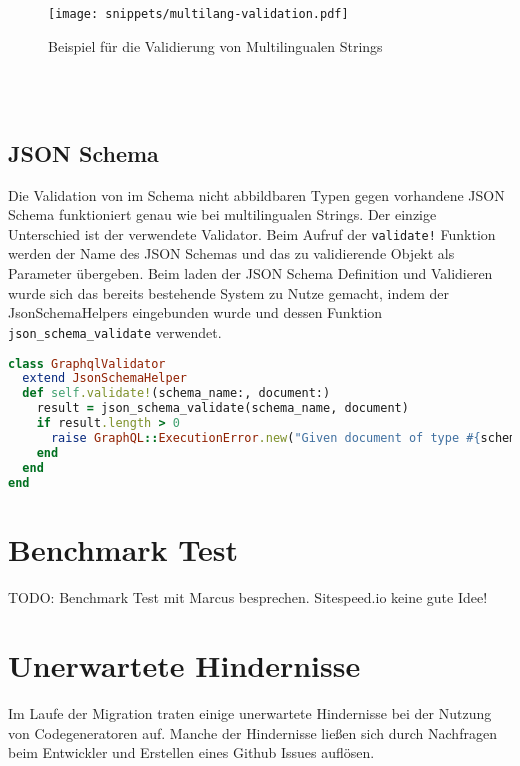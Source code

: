 \begin{figure}[h!]
    \centering
    \texttt{[image: snippets/multilang-validation.pdf]}
    \caption{Beispiel für die Validierung von Multilingualen Strings}
    \label{req:typesafe:example}
\end{figure}

\ \\
\ \\

\subsection{JSON Schema}
Die Validation von im Schema nicht abbildbaren Typen gegen vorhandene JSON Schema funktioniert genau wie bei multilingualen Strings. Der einzige Unterschied ist der verwendete Validator. Beim Aufruf der \lstinline|validate!| Funktion werden der Name des JSON Schemas und das zu validierende Objekt  als Parameter übergeben. Beim laden der JSON Schema Definition und Validieren wurde sich das bereits bestehende System zu Nutze gemacht, indem der JsonSchemaHelpers eingebunden wurde und dessen Funktion \lstinline|json_schema_validate| verwendet. 

\begin{lstlisting}[language=Ruby,float=h!,caption={Validator Klasse zum Prüfen, ob der übergebene Parameter die Beschaffenheit des JSON Schema aufweist. \lstinline|/graphql/validators/graphql_validator.rb|}, label={lst:jsonschema-validation}]
class GraphqlValidator
  extend JsonSchemaHelper
  def self.validate!(schema_name:, document:)
    result = json_schema_validate(schema_name, document)
    if result.length > 0
      raise GraphQL::ExecutionError.new("Given document of type #{schema_name} does not match the schema[...]", extensions: { code: 'VALIDATION' })
    end
  end
end
\end{lstlisting}


\section{Benchmark Test}
TODO: Benchmark Test mit Marcus besprechen. Sitespeed.io keine gute Idee!
\section{Unerwartete Hindernisse}
Im Laufe der Migration traten einige unerwartete Hindernisse bei der Nutzung von Codegeneratoren auf. Manche der Hindernisse ließen sich durch Nachfragen beim Entwickler und Erstellen eines Github Issues auflösen.

